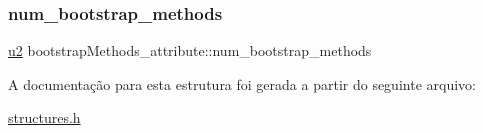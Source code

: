 \subsubsection{\texorpdfstring{num\+\_\+bootstrap\+\_\+methods}{num\_bootstrap\_methods}}
{\footnotesize\ttfamily \hyperlink{lista__operandos_8h_a732cde1300aafb73b0ea6c2558a7a54f}{u2} bootstrap\+Methods\+\_\+attribute\+::num\+\_\+bootstrap\+\_\+methods}



A documentação para esta estrutura foi gerada a partir do seguinte arquivo\+:\begin{DoxyCompactItemize}
\item 
\hyperlink{structures_8h}{structures.\+h}\end{DoxyCompactItemize}
